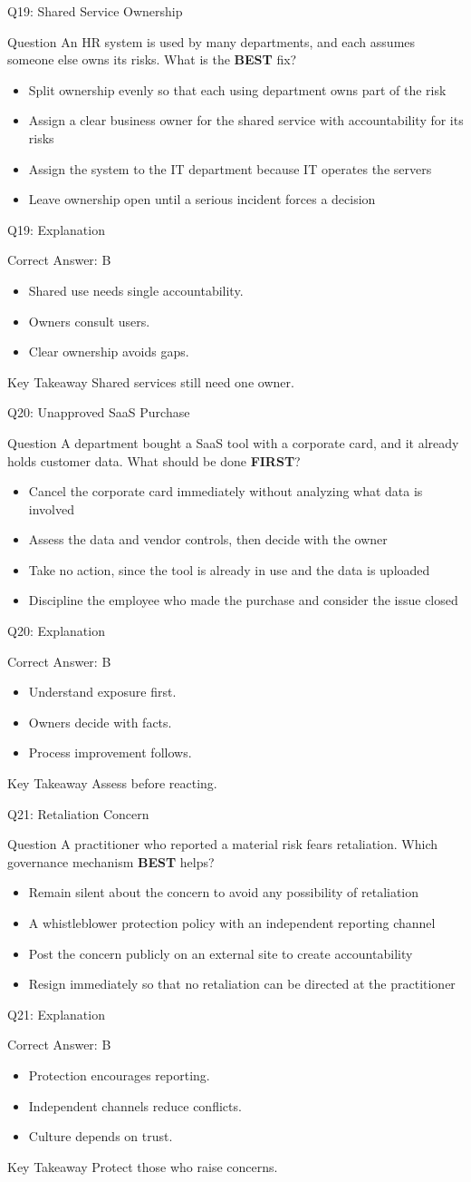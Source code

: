 \documentclass[aspectratio=169]{beamer}
\newcommand{\hq}[7]{%
	\begin{frame}{Q#1: #2}
		\begin{block}{Question}
			#3
		\end{block}
		\begin{itemize}
			#4
		\end{itemize}
	\end{frame}
	\begin{frame}{Q#1: Explanation}
		\begin{block}{Correct Answer: #5}
			\begin{itemize}
				#6
			\end{itemize}
		\end{block}
		\begin{alertblock}{Key Takeaway}
			#7
		\end{alertblock}
	\end{frame}
}
\begin{document}
	\hq{19}{Shared Service Ownership}
	{An HR system is used by many departments, and each assumes someone else owns its risks. What is the \textbf{BEST} fix?}
	{\item[\textbf{(A)}] Split ownership evenly so that each using department owns part of the risk
		\item[\textbf{(B)}] Assign a clear business owner for the shared service with accountability for its risks
		\item[\textbf{(C)}] Assign the system to the IT department because IT operates the servers
		\item[\textbf{(D)}] Leave ownership open until a serious incident forces a decision}
	{B}
	{\item Shared use needs single accountability.
		\item Owners consult users.
		\item Clear ownership avoids gaps.}
	{Shared services still need one owner.}

	\hq{20}{Unapproved SaaS Purchase}
	{A department bought a SaaS tool with a corporate card, and it already holds customer data. What should be done \textbf{FIRST}?}
	{\item[\textbf{(A)}] Cancel the corporate card immediately without analyzing what data is involved
		\item[\textbf{(B)}] Assess the data and vendor controls, then decide with the owner
		\item[\textbf{(C)}] Take no action, since the tool is already in use and the data is uploaded
		\item[\textbf{(D)}] Discipline the employee who made the purchase and consider the issue closed}
	{B}
	{\item Understand exposure first.
		\item Owners decide with facts.
		\item Process improvement follows.}
	{Assess before reacting.}

	\hq{21}{Retaliation Concern}
	{A practitioner who reported a material risk fears retaliation. Which governance mechanism \textbf{BEST} helps?}
	{\item[\textbf{(A)}] Remain silent about the concern to avoid any possibility of retaliation
		\item[\textbf{(B)}] A whistleblower protection policy with an independent reporting channel
		\item[\textbf{(C)}] Post the concern publicly on an external site to create accountability
		\item[\textbf{(D)}] Resign immediately so that no retaliation can be directed at the practitioner}
	{B}
	{\item Protection encourages reporting.
		\item Independent channels reduce conflicts.
		\item Culture depends on trust.}
	{Protect those who raise concerns.}
\end{document}
